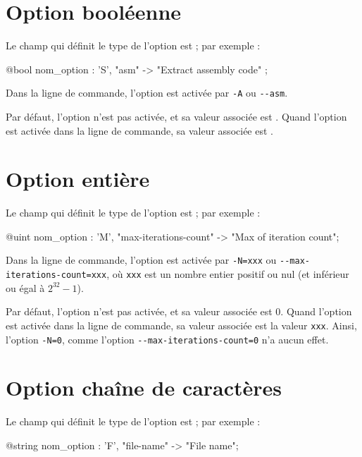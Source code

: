 \section{Option booléenne}

Le champ qui définit le type de l'option est  ; par exemple :
\begin{galgascode}
  @bool nom_option : 'S', "asm" -> "Extract assembly code" ;
\end{galgascode}

Dans la ligne de commande, l'option est activée par \texttt{-A} ou \texttt{-{}-asm}.

Par défaut, l'option n'est pas activée, et sa valeur associée est . Quand l'option est activée dans la ligne de commande, sa valeur associée est .








\section{Option entière}

Le champ qui définit le type de l'option est  ; par exemple :
\begin{galgascode}
  @uint nom_option : 'M', "max-iterations-count" -> "Max of iteration count";
\end{galgascode}

Dans la ligne de commande, l'option est activée par \texttt{-N=xxx} ou \texttt{-{}-max-iterations-count=xxx}, où \texttt{xxx} est un nombre entier positif ou nul (et inférieur ou égal à $2^{32}-1$).

Par défaut, l'option n'est pas activée, et sa valeur associée est $0$. Quand l'option est activée dans la ligne de commande, sa valeur associée est la valeur \texttt{xxx}. Ainsi, l'option \texttt{-N=0}, comme l'option \texttt{-{}-max-iterations-count=0} n'a aucun effet.










\section{Option chaîne de caractères}

Le champ qui définit le type de l'option est  ; par exemple :
\begin{galgascode}
  @string nom_option : 'F', "file-name" -> "File name";
\end{galgascode}

